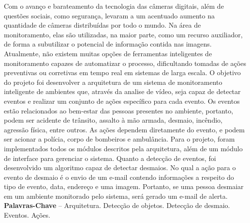 \documentclass[]{politex}
\begin{document}
\begin{resumo}
Com o avanço e barateamento da tecnologia das câmeras digitais, além de questões sociais, como segurança, levaram a um acentuado aumento na quantidade de câmeras distribuídas por todo o mundo. Na área de monitoramento, elas são utilizadas, na maior parte, como um recurso auxiliador, de forma a subutilizar o potencial de informação contida nas imagens. Atualmente, não existem muitas opções de ferramentas inteligentes de monitoramento capazes de automatizar o processo, dificultando tomadas de ações preventivas ou corretivas em tempo real em sistemas de larga escala. O objetivo do projeto foi desenvolver a arquitetura de um sistema de monitoramento inteligente de ambientes que, através da analise de vídeo, seja capaz de detectar eventos e realizar um conjunto de ações específico para cada evento. Os eventos estão relacionados ao bem-estar das pessoas presentes no ambiente, portanto, podem ser acidente de trânsito, assalto à mão armada, desmaio, incêndio, agressão física, entre outros. As ações dependem diretamente do
evento, e podem ser acionar a polícia, corpo de bombeiros e ambulância. Para o projeto, foram implementados todos os módulos descritos pela arquitetura, além de um módulo de interface para gerenciar o sistema. Quanto a detecção de eventos, foi desenvolvido um algoritmo capaz de detectar desmaios. No qual a ação para o evento de desmaio é o envio de um e-mail contendo informações a respeito do tipo de evento, data, endereço e uma imagem. Portanto, se uma pessoa desmaiar em um ambiente monitorado pelo sistema, será gerado um e-mail de alerta.
%
\\[3\baselineskip]
%
\textbf{Palavras-Chave} -- Arquitetura. Detecção de objetos. Detecção de desmaio. Eventos. Ações.
\end{resumo}
\end{document}
